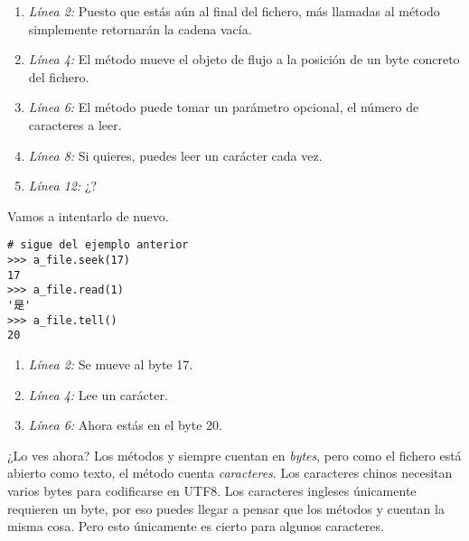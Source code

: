 \begin{enumerate}

\item \emph{Línea 2:} Puesto que estás aún al final del fichero, más llamadas al método  simplemente retornarán la cadena vacía.

\item \emph{Línea 4:} El método  mueve el objeto de flujo a la posición de un byte concreto del fichero.

\item \emph{Línea 6:} El método  puede tomar un parámetro opcional, el número de caracteres a leer.

\item \emph{Línea 8:} Si quieres, puedes leer un carácter cada vez.

\item \emph{Línea 12:} ¿?

\end{enumerate}

Vamos a intentarlo de nuevo.

\noindent\begin{minipage}{\textwidth}
\begin{lstlisting}[mathescape=True,escapeinside=@@]
# sigue del ejemplo anterior
>>> a_file.seek(17)
17
>>> a_file.read(1)
'是'
>>> a_file.tell()
20
\end{lstlisting}
\end{minipage}

\begin{enumerate}

\item \emph{Línea 2:} Se mueve al byte 17.

\item \emph{Línea 4:} Lee un carácter.

\item \emph{Línea 6:} Ahora estás en el byte 20.

\end{enumerate}

¿Lo ves ahora? Los métodos  y  siempre cuentan en \emph{bytes}, pero como el fichero está abierto como texto, el método  cuenta \emph{caracteres}. Los caracteres chinos necesitan varios bytes para codificarse en UTF8. Los caracteres ingleses únicamente requieren un byte, por eso puedes llegar a pensar que los métodos  y  cuentan la misma cosa. Pero esto únicamente es cierto para algunos caracteres.

